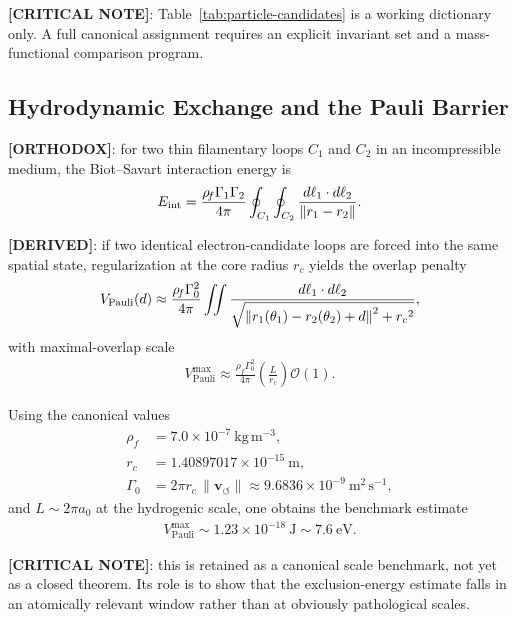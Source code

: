 \documentclass[11pt]{article}
\newcommand{\rhoF}{\rho_{\!f}}
\newcommand{\rc}{{r_c}}
\newcommand{\vnorm}{\lVert \mathbf{v}_{\!\boldsymbol{\circlearrowleft}} \rVert}
\begin{document}
\textbf{[CRITICAL NOTE]}: Table~\ref{tab:particle-candidates} is a working dictionary only. A full canonical assignment requires an explicit invariant set and a mass-functional comparison program.

\subsection{Hydrodynamic Exchange and the Pauli Barrier}
\textbf{[ORTHODOX]}: for two thin filamentary loops $C_1$ and $C_2$ in an incompressible medium, the Biot--Savart interaction energy is
\begin{align}
    E_{\mathrm{int}}
    =
    \frac{\rhoF\Gamma_1\Gamma_2}{4\pi}
    \oint_{C_1}\oint_{C_2}
    \frac{d\ell_1\cdot d\ell_2}{\norm{r_1-r_2}}.
\end{align}

\textbf{[DERIVED]}: if two identical electron-candidate loops are forced into the same spatial state, regularization at the core radius $\rc$ yields the overlap penalty
\begin{align}
    V_{\mathrm{Pauli}}(d)
    \approx
    \frac{\rhoF\Gamma_0^2}{4\pi}
    \iint
    \frac{d\ell_1\cdot d\ell_2}{\sqrt{\norm{r_1(\theta_1)-r_2(\theta_2)+d}^2+\rc^2}},
\end{align}
with maximal-overlap scale
\begin{align}
    V_{\mathrm{Pauli}}^{\max}
    \approx
    \frac{\rhoF\Gamma_0^2}{4\pi}\left(\frac{L}{\rc}\right)\mathcal{O}(1).
\end{align}

Using the canonical values
\begin{align}
    \rhoF &= 7.0\times 10^{-7}\ \mathrm{kg\,m^{-3}}, \\
    \rc &= 1.40897017\times 10^{-15}\ \mathrm{m}, \\
    \Gamma_0 &= 2\pi \rc\,\vnorm \approx 9.6836\times 10^{-9}\ \mathrm{m^2\,s^{-1}},
\end{align}
and $L\sim 2\pi a_0$ at the hydrogenic scale, one obtains the benchmark estimate
\begin{align}
    V_{\mathrm{Pauli}}^{\max} \sim 1.23\times 10^{-18}\ \mathrm{J} \sim 7.6\ \mathrm{eV}.
\end{align}

\textbf{[CRITICAL NOTE]}: this is retained as a canonical scale benchmark, not yet as a closed theorem. Its role is to show that the exclusion-energy estimate falls in an atomically relevant window rather than at obviously pathological scales.
\end{document}
